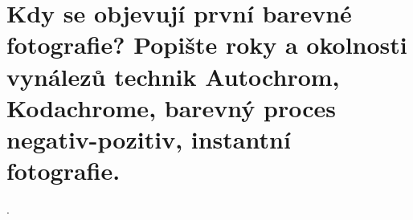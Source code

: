 \section{Kdy se objevují první barevné fotografie? Popište roky a okolnosti vynálezů technik Autochrom, Kodachrome, 
barevný proces negativ-pozitiv, instantní fotografie.}.